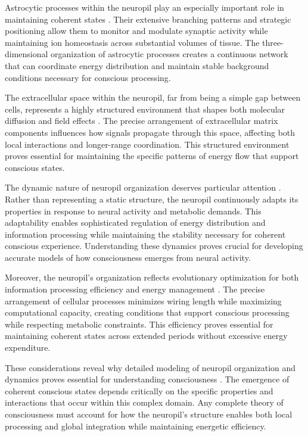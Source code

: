 \begin{refsection}
Astrocytic processes within the neuropil play an especially important role in maintaining coherent states \cite{Ventura1999}. Their extensive branching patterns and strategic positioning allow them to monitor and modulate synaptic activity while maintaining ion homeostasis across substantial volumes of tissue. The three-dimensional organization of astrocytic processes creates a continuous network that can coordinate energy distribution and maintain stable background conditions necessary for conscious processing.

The extracellular space within the neuropil, far from being a simple gap between cells, represents a highly structured environment that shapes both molecular diffusion and field effects \cite{Savtchenko2014}. The precise arrangement of extracellular matrix components influences how signals propagate through this space, affecting both local interactions and longer-range coordination. This structured environment proves essential for maintaining the specific patterns of energy flow that support conscious states.

The dynamic nature of neuropil organization deserves particular attention \cite{Sorra2000}. Rather than representing a static structure, the neuropil continuously adapts its properties in response to neural activity and metabolic demands. This adaptability enables sophisticated regulation of energy distribution and information processing while maintaining the stability necessary for coherent conscious experience. Understanding these dynamics proves crucial for developing accurate models of how consciousness emerges from neural activity.

Moreover, the neuropil's organization reflects evolutionary optimization for both information processing efficiency and energy management \cite{Peters1991}. The precise arrangement of cellular processes minimizes wiring length while maximizing computational capacity, creating conditions that support conscious processing while respecting metabolic constraints. This efficiency proves essential for maintaining coherent states across extended periods without excessive energy expenditure.

These considerations reveal why detailed modeling of neuropil organization and dynamics proves essential for understanding consciousness \cite{Mishchenko2010}. The emergence of coherent conscious states depends critically on the specific properties and interactions that occur within this complex domain. Any complete theory of consciousness must account for how the neuropil's structure enables both local processing and global integration while maintaining energetic efficiency.


\end{refsection}
